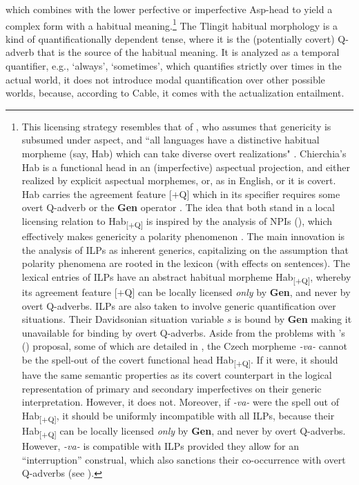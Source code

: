 \documentclass[output=paper,colorlinks,citecolor=brown]{langscibook}
\begin{document}
which combines with the lower perfective or imperfective Asp-head to yield a complex form with a habitual meaning.\footnote{This licensing strategy resembles that of \citet{chierchia1995}, who assumes that genericity is subsumed
under aspect, and ``all languages have a distinctive habitual morpheme (say, Hab) which
can take diverse overt realizations" \citep[197]{chierchia1995}. Chierchia's Hab is a functional head in an (imperfective) aspectual projection, and
either realized by explicit aspectual morphemes, or, as in English, or it is covert. Hab
carries the agreement feature [$+$Q]  which in its specifier requires some overt Q-adverb \citep[197--198]{chierchia1995} or the \textbf{Gen} operator \citep[210]{chierchia1995}. The idea that both stand in a local licensing relation to Hab\textsubscript{[$+$Q]} is inspired by the analysis of NPIs (\citealt{ladusaw1979polarity}), which effectively makes genericity a polarity
phenomenon \citep[212ff.]{chierchia1995}. The main innovation is the
analysis of ILPs as inherent generics,
capitalizing on the assumption that polarity phenomena are rooted in the lexicon (with effects on sentences). The lexical entries of ILPs have an abstract habitual morpheme
Hab\textsubscript{[$+$Q]}, whereby its agreement feature [$+$Q]
can be locally licensed \textit{only} by \textbf{Gen}, and never by overt Q-adverbs.
ILPs are also taken to involve generic quantification over situations.
Their Davidsonian situation variable $s$ is bound by \textbf{Gen}
making it unavailable for binding by overt Q-adverbs.
Aside from the problems with \citeauthor{chierchia1995}'s (\citeyear{chierchia1995}) proposal,
some of which are detailed in \citet{fernald2000}, the Czech morpheme \textit{-va-} cannot be the spell-out of the covert functional head Hab\textsubscript{[$+$Q]}. If it were, it should have
the same semantic properties as its covert counterpart in the logical representation of primary and secondary
imperfectives on their generic interpretation. However, it does not. Moreover, if
\textit{-va-} were the spell out of Hab\textsubscript{[$+$Q]}, it should be uniformly incompatible with all ILPs, because their Hab\textsubscript{[$+$Q]}
can be locally licensed \textit{only} by \textbf{Gen}, and never by overt Q-adverbs.
However, \textit{-va-} is compatible with ILPs provided they allow for an ``interruption'' construal, which also sanctions their co-occurrence
with overt Q-adverbs (see ). }
The Tlingit habitual
morphology is a kind of quantificationally dependent tense,
where it is the (potentially covert) Q-adverb
that is the source of the habitual meaning.
It is analyzed as a temporal quantifier, e.g., `always', `sometimes', which quantifies strictly over times in the actual world, it does not introduce modal quantification over other possible worlds, because, according to Cable, it comes with the actualization entailment.
\end{document}
